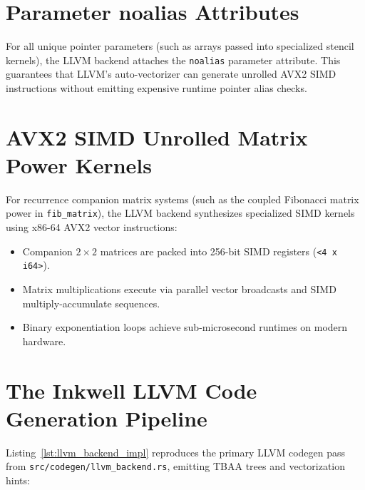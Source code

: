 \section{Parameter noalias Attributes}
\label{sec:llvm:noalias}

For all unique pointer parameters (such as arrays passed into specialized stencil kernels), the LLVM backend attaches the \texttt{noalias} parameter attribute. This guarantees that LLVM's auto-vectorizer can generate unrolled AVX2 SIMD instructions without emitting expensive runtime pointer alias checks.

\section{AVX2 SIMD Unrolled Matrix Power Kernels}
\label{sec:llvm:simd}

For recurrence companion matrix systems (such as the coupled Fibonacci matrix power in \texttt{fib\_matrix}), the LLVM backend synthesizes specialized SIMD kernels using x86-64 AVX2 vector instructions:
\begin{itemize}
    \item Companion $2 \times 2$ matrices are packed into 256-bit SIMD registers (\texttt{<4 x i64>}).
    \item Matrix multiplications execute via parallel vector broadcasts and SIMD multiply-accumulate sequences.
    \item Binary exponentiation loops achieve sub-microsecond runtimes on modern hardware.
\end{itemize}

\section{The Inkwell LLVM Code Generation Pipeline}
\label{sec:llvm:backend_impl}

Listing~\ref{lst:llvm_backend_impl} reproduces the primary LLVM codegen pass from \texttt{src/codegen/llvm\_backend.rs}, emitting TBAA trees and vectorization hints:

